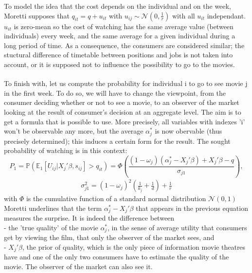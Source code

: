 	To model the idea that the cost depends on the individual and on the week, Moretti supposes that $q_{i t}=q+u_{i t}$ with $u_{i j}\sim \mathcal{N}(0,\frac{1}{r})$ with all $u_{i t}$ independant. $u_{i t}$ is zero-mean so the cost of watching has the same average value (between individuals) every week, and the same average for a given individual during a long period of time. As a consequence, the consumers are considered similar; the stuctural difference of timetable between positions and jobs is not taken into account, or it is supposed not to influence the possibility to go to the movies.\\
	\\
	To finish with, let us compute the probability for individual i to go to see movie j in the first week. To do so, we will have to change the viewpoint, from the consumer deciding whether or not to see a movie, to an observer of the market looking at the result of consumer's decision at an aggregate level. The aim is to get a formula that is possible to use. More precisely, all variables with indexes 'i' won't be observable any more, but the average $\alpha_{j}^{*}$ is now obervable (thus precisely determined); this induces a certain form for the result. The sought probability of watching is in this context:
	\begin{equation} \label{eq:4}
	P_{1}=\mathbb{P}(\mathbb{E}_1[U_{i j}|X_{j}'\beta, s_{i j}]>q_{i t})=\Phi\left(\frac{(1-\omega_{j})(\alpha_{j}^{*}-X_{j}'\beta)+X_{j}'\beta-q}{\sigma_{j 1}}\right),
	\end{equation}
	\begin{align*}
	\sigma_{j 1}^{2}=(1-\omega_{j})^{2}\left(\frac{1}{k_{j}}+\frac{1}{d}\right)+\frac{1}{r}
	\end{align*}
with $\Phi$ is the cumulative function of a standard normal distribution $\mathcal{N}(0,1)$
	Moretti underlines that the term $\alpha_{j}^{*}-X_{j}'\beta$ that appears in the previous equation measures the surprise. It is indeed the difference between\\
	- the 'true quality' of the movie $\alpha_{j}^{*}$, in the sense of average utility that consumers get by viewing the film, that only the observer of the market sees, and\\
	- $X_{j}'\beta$, the prior of quality, which is the only piece of information movie theatres have and one of the only two consumers have to estimate the quality of the movie. The observer of the market can also see it.\\
